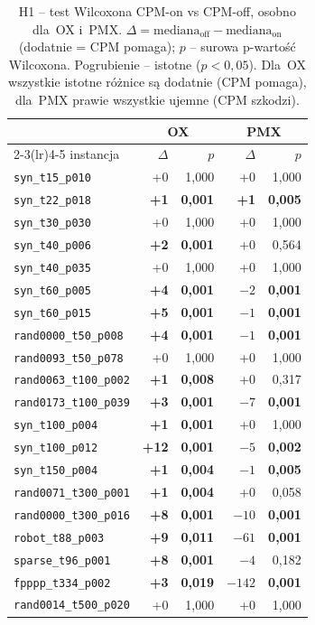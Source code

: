 \documentclass[pdflatex,sn-mathphys,Numbered]{sn-jnl}
\begin{document}
\begin{table}[ht]
\centering\scriptsize\setlength{\tabcolsep}{5pt}
\begin{tabular}{lrrrr}
\toprule
& \multicolumn{2}{c}{OX} & \multicolumn{2}{c}{PMX} \\
\cmidrule(lr){2-3}\cmidrule(lr){4-5}
instancja & $\Delta$ & $p$ & $\Delta$ & $p$ \\
\midrule
\texttt{syn\_t15\_p010} & +0 & 1{,}000 & +0 & 1{,}000 \\
\texttt{syn\_t22\_p018} & \textbf{+1} & \textbf{0{,}001} & \textbf{+1} & \textbf{0{,}005} \\
\texttt{syn\_t30\_p030} & +0 & 1{,}000 & +0 & 1{,}000 \\
\texttt{syn\_t40\_p006} & \textbf{+2} & \textbf{0{,}001} & +0 & 0{,}564 \\
\texttt{syn\_t40\_p035} & +0 & 1{,}000 & +0 & 1{,}000 \\
\texttt{syn\_t60\_p005} & \textbf{+4} & \textbf{0{,}001} & \textbf{$-2$} & \textbf{0{,}001} \\
\texttt{syn\_t60\_p015} & \textbf{+5} & \textbf{0{,}001} & \textbf{$-1$} & \textbf{0{,}001} \\
\texttt{rand0000\_t50\_p008} & \textbf{+4} & \textbf{0{,}001} & \textbf{$-1$} & \textbf{0{,}001} \\
\texttt{rand0093\_t50\_p078} & +0 & 1{,}000 & +0 & 1{,}000 \\
\texttt{rand0063\_t100\_p002} & \textbf{+1} & \textbf{0{,}008} & +0 & 0{,}317 \\
\texttt{rand0173\_t100\_p039} & \textbf{+3} & \textbf{0{,}001} & \textbf{$-7$} & \textbf{0{,}001} \\
\texttt{syn\_t100\_p004} & \textbf{+1} & \textbf{0{,}001} & +0 & 1{,}000 \\
\texttt{syn\_t100\_p012} & \textbf{+12} & \textbf{0{,}001} & \textbf{$-5$} & \textbf{0{,}002} \\
\texttt{syn\_t150\_p004} & \textbf{+1} & \textbf{0{,}004} & \textbf{$-1$} & \textbf{0{,}005} \\
\texttt{rand0071\_t300\_p001} & \textbf{+1} & \textbf{0{,}004} & +0 & 0{,}058 \\
\texttt{rand0000\_t300\_p016} & \textbf{+8} & \textbf{0{,}001} & \textbf{$-10$} & \textbf{0{,}001} \\
\texttt{robot\_t88\_p003} & \textbf{+9} & \textbf{0{,}011} & \textbf{$-61$} & \textbf{0{,}001} \\
\texttt{sparse\_t96\_p001} & \textbf{+8} & \textbf{0{,}001} & $-4$ & 0{,}182 \\
\texttt{fpppp\_t334\_p002} & \textbf{+3} & \textbf{0{,}019} & \textbf{$-142$} & \textbf{0{,}001} \\
\texttt{rand0014\_t500\_p020} & +0 & 1{,}000 & +0 & 1{,}000 \\
\bottomrule
\end{tabular}
\caption{H1 -- test Wilcoxona CPM-on vs CPM-off, osobno dla~OX i~PMX.
$\Delta = \text{mediana}_{\text{off}} - \text{mediana}_{\text{on}}$ (dodatnie =
CPM pomaga); $p$ -- surowa p-wartość Wilcoxona. Pogrubienie -- istotne
($p<0{,}05$). Dla~OX wszystkie istotne różnice są dodatnie (CPM pomaga), dla~PMX
prawie wszystkie ujemne (CPM szkodzi).}
\label{tab:h1}
\end{table}
\end{document}
